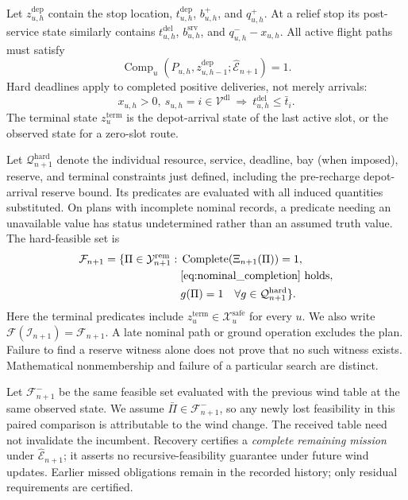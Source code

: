 Let $z_{u,h}^{\mathrm{dep}}$ contain the stop location,
$t_{u,h}^{\mathrm{dep}}$, $b_{u,h}^{+}$, and $q_{u,h}^{+}$.
At a relief stop its post-service state similarly contains
$t_{u,h}^{\mathrm{del}}$, $b_{u,h}^{\mathrm{srv}}$, and
$q_{u,h}^{-}-x_{u,h}$.
All active flight paths must satisfy
\begin{equation}
\operatorname{Comp}_u(P_{u,h},z_{u,h-1}^{\mathrm{dep}};
\widehat{\mathcal E}_{n+1})=1.
\label{eq:nominal_completion}
\end{equation}
Hard deadlines apply to completed positive deliveries, not merely arrivals:
\begin{equation}
x_{u,h}>0,\ s_{u,h}=i\in\mathcal V^{\mathrm{dl}}
\ \Longrightarrow\ t_{u,h}^{\mathrm{del}}\le\bar t_i.
\label{eq:time_constraints}
\end{equation}
The terminal state $z_u^{\mathrm{term}}$ is the depot-arrival state of the
last active slot, or the observed state for a zero-slot route.

Let $\mathcal Q_{n+1}^{\mathrm{hard}}$ denote the individual resource,
service, deadline, bay (when imposed), reserve, and terminal constraints just
defined, including the pre-recharge depot-arrival reserve bound.
Its predicates are evaluated with all induced quantities substituted.
On plans with incomplete nominal records, a predicate needing an
unavailable value has status undetermined rather than an assumed truth
value. The hard-feasible set is
\begin{equation}
\begin{split}
\mathcal F_{n+1}=\{\Pi\in\mathcal Y_{n+1}^{\mathrm{rem}}:\;&
\operatorname{Complete}(\Xi_{n+1}(\Pi))=1,\\
&\eqref{eq:nominal_completion}\text{ holds},\\
&g(\Pi)=1\quad\forall g\in\mathcal Q_{n+1}^{\mathrm{hard}}\}.
\end{split}
\label{eq:hard_feasible_set}
\end{equation}
Here the terminal predicates include
$z_u^{\mathrm{term}}\in\mathcal X_u^{\mathrm{safe}}$ for every $u$.
We also write $\mathcal F(\mathscr I_{n+1})=\mathcal F_{n+1}$.
A late nominal path or ground operation excludes the plan. Failure to find
a reserve witness alone does not prove that no such witness exists.
Mathematical nonmembership and failure of a particular search are distinct.

Let $\mathcal F_{n+1}^{-}$ be the same feasible set evaluated with the
previous wind table at the same observed state. We assume
$\bar\Pi\in\mathcal F_{n+1}^{-}$, so any newly lost feasibility in this
paired comparison is attributable to the wind change. The received table
need not invalidate the incumbent. Recovery certifies a \emph{complete
remaining mission} under $\widehat{\mathcal E}_{n+1}$; it asserts no
recursive-feasibility guarantee under future wind updates.
Earlier missed obligations remain in the recorded history; only residual
requirements are certified.



